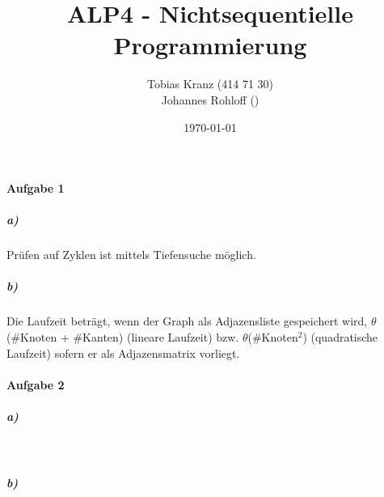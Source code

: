 \documentclass[11pt]{scrartcl} %
\date{\today}
\author{Tobias Kranz (414 71 30)\\ Johannes Rohloff ()}
\title{ALP4 - Nichtsequentielle Programmierung \UEBUNGSNR{}}
\begin{document}
\maketitle
\paragraph{Aufgabe 1}

\subparagraph{a)} Prüfen auf Zyklen ist mittels Tiefensuche möglich.

\subparagraph{b)} Die Laufzeit beträgt, wenn der Graph als Adjazensliste gespeichert wird, $\theta$(\#Knoten + \#Kanten) (lineare Laufzeit) bzw. $\theta$(\#Knoten$^2$) (quadratische Laufzeit) sofern er als Adjazensmatrix vorliegt.

\paragraph{Aufgabe 2}  

\subparagraph{a)}\



\subparagraph{b)}\


\end{document}
